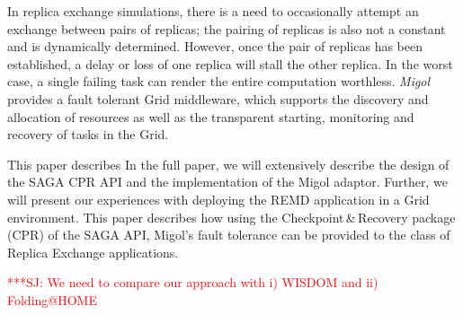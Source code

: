 \documentclass[times, 10pt,twocolumn]{article}
\newcommand{\jhanote}[1]{ {\textcolor{red} { ***SJ: #1 }}}
\begin{document}
In replica exchange simulations, there is a need to occasionally attempt an exchange
between pairs of replicas; the pairing of replicas is also not a
constant and is dynamically determined. However, once the pair of
replicas has been established, a delay or loss of one replica will
stall the other replica. In the worst case, a single failing task can
render the entire computation worthless.
\emph{Migol}~\cite{schnorLuckow08} provides a fault tolerant Grid
middleware, which supports the discovery and allocation of resources
as well as the transparent starting, monitoring and recovery of tasks in the Grid.          



This paper describes In the full paper, we will extensively  describe the design of the SAGA CPR API and the implementation 
of the Migol adaptor. Further, we will present our experiences with deploying  
the REMD application in a Grid environment.
This paper describes how using the Checkpoint\,\&\,Recovery package
(CPR) of the SAGA API, Migol's fault tolerance can be provided to the
class of Replica Exchange applications.   

\jhanote{We need to compare our approach with i) WISDOM and ii)
  Folding@HOME}             
\end{document}

